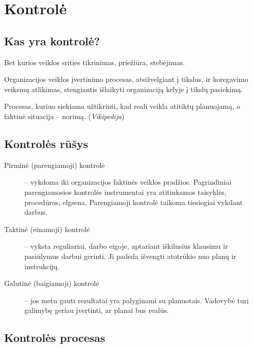 \chapter{Kontrolė}

\section{Kas yra kontrolė?}

\begin{defn}[Kontrolė]
  Bet kurios veiklos srities tikrinimas, priežiūra, stebėjimas.
\end{defn}

\begin{defn}[Kontrolė]
  Organizacijos veiklos įvertinimo procesas, atsižvelgiant į tikslus,
  ir koregavimo veiksmų atlikimas, stengiantis išlaikyti organizaciją
  kelyje į tikslų pasiekimą.
\end{defn}

\begin{defn}[Kontrolė]
  Procesas, kuriuo siekiama užtikrinti, kad reali veikla atitiktų
  planuojamą, o faktinė situacija – norimą. (\emph{Vikipedija})
\end{defn}

\section{Kontrolės rūšys}

\begin{description}
  \item[Pirminė (parengiamoji) kontrolė] – vykdoma iki organizacijos
    faktinės veiklos pradžios. Pagrindiniai parengiamosios kontrolės
    instrumentai yra atitinkamos taisyklės, procedūros, elgsena.
    Parengiamoji kontrolė taikoma tiesiogiai vykdant darbus.
  \item[Taktinė (einamoji) kontrolė] – vyksta reguliariai, darbo
    eigoje, aptariant iškilusius klausimu ir pasiūlymus darbui
    gerinti. Ji padeda išvengti atotrūkio nuo planų ir instrukcijų.
  \item[Galutinė (baigiamoji) kontrolė] – jos metu gauti rezultatai
    yra palyginami su planuotais. Vadovybė turi galimybę geriau
    įvertinti, ar planai bus realūs.
\end{description}

\section{Kontrolės procesas}

